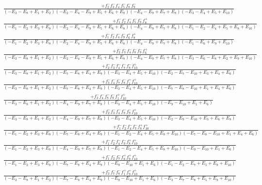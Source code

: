 \documentclass{article}
\begin{document}
\[\begin{array}{rcl}
\frac{+f_{2}^{-}f_{3}^{-}f_{4}^{-}f_{5}^{-}f_{8}^{-}f_{9}^{-}}{(-E_{3}-E_{8}+E_{1}+E_{2})(-E_{2}-E_{4}-E_{9}+E_{5}+E_{6}+E_{8})(-E_{4}-E_{9}+E_{7}+E_{8})(-E_{3}-E_{4}+E_{5}+E_{10})}\\
\frac{+f_{1}^{-}f_{2}^{-}f_{4}^{-}f_{5}^{-}f_{9}^{-}f_{8}^{+}}{(-E_{1}-E_{2}+E_{3}+E_{8})(-E_{2}-E_{4}-E_{9}+E_{5}+E_{6}+E_{8})(-E_{4}-E_{9}+E_{7}+E_{8})(-E_{1}-E_{2}-E_{4}+E_{5}+E_{8}+E_{10})}\\
\frac{+f_{1}^{-}f_{2}^{-}f_{4}^{-}f_{9}^{-}f_{6}^{+}f_{8}^{+}}{(-E_{1}-E_{2}+E_{3}+E_{8})(-E_{2}-E_{4}-E_{9}+E_{5}+E_{6}+E_{8})(-E_{4}-E_{9}+E_{7}+E_{8})(-E_{1}-E_{6}+E_{9}+E_{10})}\\
\frac{+f_{2}^{-}f_{3}^{-}f_{4}^{-}f_{8}^{-}f_{9}^{-}f_{6}^{+}}{(-E_{3}-E_{8}+E_{1}+E_{2})(-E_{2}-E_{4}-E_{9}+E_{5}+E_{6}+E_{8})(-E_{4}-E_{9}+E_{7}+E_{8})(-E_{3}-E_{6}-E_{8}+E_{2}+E_{9}+E_{10})}\\
\frac{+f_{2}^{-}f_{3}^{-}f_{4}^{-}f_{7}^{-}f_{8}^{-}f_{10}^{+}}{(-E_{3}-E_{8}+E_{1}+E_{2})(-E_{7}-E_{8}+E_{4}+E_{9})(-E_{3}-E_{4}+E_{5}+E_{10})(-E_{2}-E_{7}-E_{10}+E_{3}+E_{4}+E_{6})}\\
\frac{+f_{3}^{-}f_{4}^{-}f_{7}^{-}f_{8}^{-}f_{1}^{+}f_{10}^{+}}{(-E_{3}-E_{8}+E_{1}+E_{2})(-E_{7}-E_{8}+E_{4}+E_{9})(-E_{3}-E_{4}+E_{5}+E_{10})(-E_{7}-E_{8}-E_{10}+E_{1}+E_{4}+E_{6})}\\
\frac{+f_{3}^{-}f_{4}^{-}f_{8}^{-}f_{9}^{-}f_{1}^{+}f_{10}^{+}}{(-E_{3}-E_{8}+E_{1}+E_{2})(-E_{4}-E_{9}+E_{7}+E_{8})(-E_{3}-E_{4}+E_{5}+E_{10})(-E_{9}-E_{10}+E_{1}+E_{6})}\\
\frac{+f_{2}^{-}f_{3}^{-}f_{4}^{-}f_{8}^{-}f_{9}^{-}f_{10}^{+}}{(-E_{3}-E_{8}+E_{1}+E_{2})(-E_{4}-E_{9}+E_{7}+E_{8})(-E_{3}-E_{4}+E_{5}+E_{10})(-E_{2}-E_{9}-E_{10}+E_{3}+E_{6}+E_{8})}\\
\frac{+f_{1}^{-}f_{2}^{-}f_{4}^{-}f_{7}^{-}f_{8}^{+}f_{10}^{+}}{(-E_{1}-E_{2}+E_{3}+E_{8})(-E_{7}-E_{8}+E_{4}+E_{9})(-E_{1}-E_{2}-E_{4}+E_{5}+E_{8}+E_{10})(-E_{7}-E_{8}-E_{10}+E_{1}+E_{4}+E_{6})}\\
\frac{+f_{1}^{-}f_{2}^{-}f_{4}^{-}f_{9}^{-}f_{8}^{+}f_{10}^{+}}{(-E_{1}-E_{2}+E_{3}+E_{8})(-E_{4}-E_{9}+E_{7}+E_{8})(-E_{1}-E_{2}-E_{4}+E_{5}+E_{8}+E_{10})(-E_{9}-E_{10}+E_{1}+E_{6})}\\
\frac{+f_{1}^{-}f_{2}^{-}f_{7}^{-}f_{8}^{+}f_{9}^{+}f_{10}^{+}}{(-E_{1}-E_{2}+E_{3}+E_{8})(-E_{7}-E_{8}+E_{4}+E_{9})(-E_{9}-E_{10}+E_{1}+E_{6})(-E_{1}-E_{2}-E_{7}+E_{5}+E_{9}+E_{10})}\\
\frac{+f_{3}^{-}f_{7}^{-}f_{8}^{-}f_{1}^{+}f_{9}^{+}f_{10}^{+}}{(-E_{3}-E_{8}+E_{1}+E_{2})(-E_{7}-E_{8}+E_{4}+E_{9})(-E_{9}-E_{10}+E_{1}+E_{6})(-E_{3}-E_{7}-E_{8}+E_{5}+E_{9}+E_{10})}\\

\end{array}\]
\end{document}
